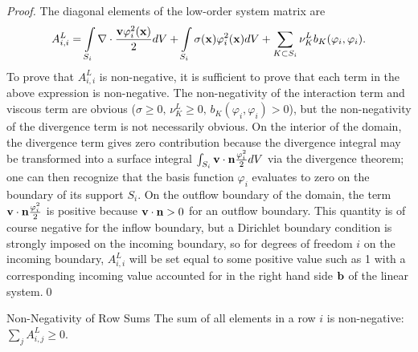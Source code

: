 \begin{proof}
The diagonal elements of the low-order system matrix are
\[
   A^L_{i,i} = \int\limits_{S_i}\nabla\cdot
   \frac{\mathbf{v}\varphi_i^2(\mathbf{x})}{2} dV
      + \int\limits_{S_i}\sigma(\mathbf{x})\varphi_i^2(\mathbf{x})dV
      + \sum\limits_{K\subset S_i}\nu_K^L b_K(\varphi_i, \varphi_i).
\]
To prove that $A^L_{i,i}$ is non-negative, it is sufficient to prove that
each term in the above expression is non-negative. The non-negativity of
the interaction term and viscous term are obvious ($\sigma \ge 0, 
\, \nu_K^L\ge 0, \, b_K(\varphi_i, \varphi_i)>0$), but
the non-negativity of the divergence term is not necessarily obvious. On the interior of
the domain, the divergence term gives zero contribution because the divergence integral may
be transformed into a surface integral $\int_{S_i}\mathbf{v}\cdot\mathbf{n}\frac{\varphi_i^2}{2} dV$
via the divergence theorem; one can then recognize that
the basis function $\varphi_i$ evaluates to zero on the boundary of its support $S_{i}$.
On the outflow boundary of the domain, the term $\mathbf{v}\cdot\mathbf{n}
\frac{\varphi_i^2}{2}$ is positive because $\mathbf{v}\cdot\mathbf{n} >0$
for an outflow boundary. This quantity is of course negative for the inflow boundary,
but a Dirichlet boundary condition is strongly imposed on the incoming boundary, so
for degrees of freedom $i$ on the incoming boundary, $A^L_{i,i}$ will be set equal
to some positive value such as 1 with a corresponding incoming value
accounted for in the right hand side $\mathbf{b}$ of the linear system.\qed
\end{proof}
\begin{lemma}{Non-Negativity of Row Sums}
   The sum of all elements in a row $i$ is non-negative: $\sum\limits_j A^L_{i,j} \ge 0$.
\end{lemma}


